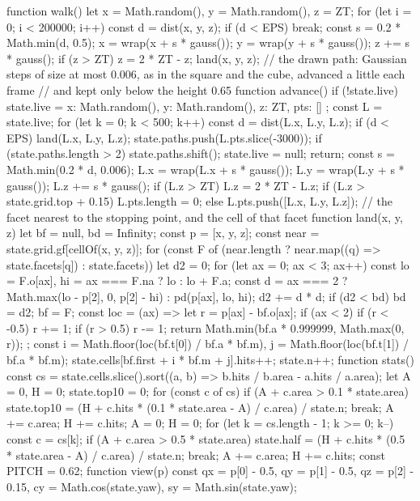 \begin{js}
function walk() {
  let x = Math.random(), y = Math.random(), z = ZT;
  for (let i = 0; i < 200000; i++) {
    const d = dist(x, y, z);
    if (d < EPS) break;
    const s = 0.2 * Math.min(d, 0.5);
    x = wrap(x + s * gauss()); y = wrap(y + s * gauss()); z += s * gauss(); if (z > ZT) z = 2 * ZT - z;
  }
  land(x, y, z);
}
// the drawn path: Gaussian steps of size at most 0.006, as in the square and the cube, advanced a little each frame
// and kept only below the height 0.65
function advance() {
  if (!state.live) state.live = { x: Math.random(), y: Math.random(), z: ZT, pts: [] };
  const L = state.live;
  for (let k = 0; k < 500; k++) {
    const d = dist(L.x, L.y, L.z);
    if (d < EPS) { land(L.x, L.y, L.z); state.paths.push(L.pts.slice(-3000)); if (state.paths.length > 2) state.paths.shift(); state.live = null; return; }
    const s = Math.min(0.2 * d, 0.006);
    L.x = wrap(L.x + s * gauss()); L.y = wrap(L.y + s * gauss()); L.z += s * gauss(); if (L.z > ZT) L.z = 2 * ZT - L.z;
    if (L.z > state.grid.top + 0.15) L.pts.length = 0; else L.pts.push([L.x, L.y, L.z]);
  }
}
// the facet nearest to the stopping point, and the cell of that facet
function land(x, y, z) {
  let bf = null, bd = Infinity;
  const p = [x, y, z];
  const near = state.grid.gf[cellOf(x, y, z)];
  for (const F of (near.length ? near.map((q) => state.facets[q]) : state.facets)) {
    let d2 = 0;
    for (let ax = 0; ax < 3; ax++) {
      const lo = F.o[ax], hi = ax === F.na ? lo : lo + F.a;
      const d = ax === 2 ? Math.max(lo - p[2], 0, p[2] - hi) : pd(p[ax], lo, hi); d2 += d * d;
    }
    if (d2 < bd) { bd = d2; bf = F; }
  }
  const loc = (ax) => { let r = p[ax] - bf.o[ax]; if (ax < 2) { if (r < -0.5) r += 1; if (r > 0.5) r -= 1; } return Math.min(bf.a * 0.999999, Math.max(0, r)); };
  const i = Math.floor(loc(bf.t[0]) / bf.a * bf.m), j = Math.floor(loc(bf.t[1]) / bf.a * bf.m);
  state.cells[bf.first + i * bf.m + j].hits++; state.n++;
}
function stats() {
  const cs = state.cells.slice().sort((a, b) => b.hits / b.area - a.hits / a.area);
  let A = 0, H = 0; state.top10 = 0;
  for (const c of cs) { if (A + c.area > 0.1 * state.area) { state.top10 = (H + c.hits * (0.1 * state.area - A) / c.area) / state.n; break; } A += c.area; H += c.hits; }
  A = 0; H = 0;
  for (let k = cs.length - 1; k >= 0; k--) { const c = cs[k]; if (A + c.area > 0.5 * state.area) { state.half = (H + c.hits * (0.5 * state.area - A) / c.area) / state.n; break; } A += c.area; H += c.hits; }
}
const PITCH = 0.62;
function view(p) {
  const qx = p[0] - 0.5, qy = p[1] - 0.5, qz = p[2] - 0.15, cy = Math.cos(state.yaw), sy = Math.sin(state.yaw);
}
\end{js}
